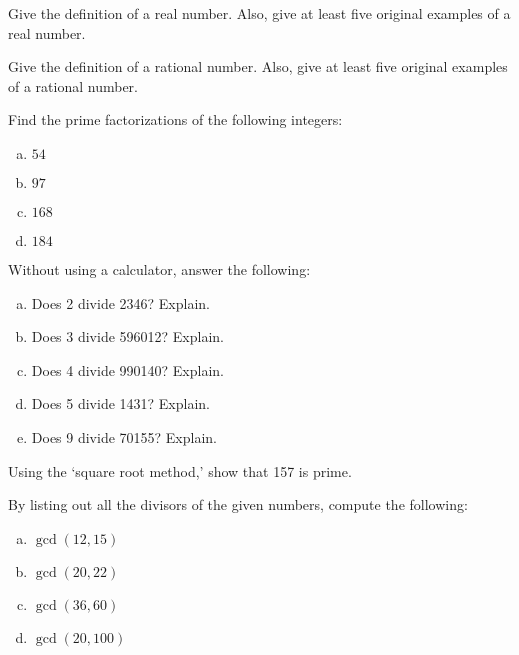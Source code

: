 \documentclass[11pt,letterpaper]{article}
\begin{document}

 Give the definition of a real number. Also, give at least five original examples of a real number. 



\newpage



 Give the definition of a rational number. Also, give at least five original examples of a rational number. 



\newpage



 Find the prime factorizations of the following integers:
	\begin{enumerate}[(a)]
	\item $54$
	\item $97$
	\item $168$
	\item $184$
	\end{enumerate}



\newpage



 Without using a calculator, answer the following:
	\begin{enumerate}[(a)]
	\item Does 2 divide 2346? Explain.
	\item Does 3 divide 596012? Explain.
	\item Does 4 divide 990140? Explain.
	\item Does 5 divide 1431? Explain.
	\item Does 9 divide 70155? Explain. 
	\end{enumerate}



\newpage



 Using the `square root method,' show that 157 is prime. 



\newpage



 By listing out all the divisors of the given numbers, compute the following:
	\begin{enumerate}[(a)]
	\item $\gcd(12, 15)$
	\item $\gcd(20, 22)$
	\item $\gcd(36, 60)$
	\item $\gcd(20, 100)$
	\end{enumerate}
\end{document}
